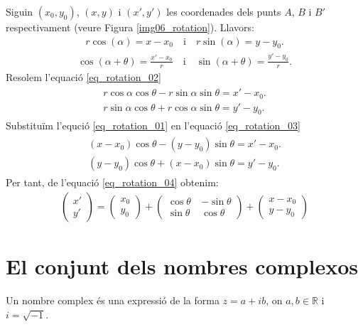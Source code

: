\documentclass[12pt,a4paper]{report}
\begin{document}
Siguin $(x_0,y_0)$, $(x,y)$ i $(x',y')$ les coordenades dels punts $A$, $B$ i $B'$ respectivament (veure Figura \ref{img06_rotation}). Llavors:
\begin{align}
r\cos(\alpha)=x-x_0 \quad\text{i}\quad r\sin(\alpha)=y-y_0.
\label{eq_rotation_01}
\end{align}
\begin{align}
\cos(\alpha+\theta)=\frac{x'-x_0}{r}\quad \text{i}\quad \sin(\alpha + \theta)=\frac{y'-y_0}{r}.
\label{eq_rotation_02}
\end{align}
Resolem l'equació \ref{eq_rotation_02}
\begin{align}
\begin{split}
r\cos\alpha\cos\theta-r\sin\alpha\sin\theta=x' - x_0.\\
r\sin\alpha\cos\theta+r\cos\alpha\sin\theta=y' - y_0.
\label{eq_rotation_03}
\end{split}
\end{align}
Substituïm l'equció \ref{eq_rotation_01} en l'equació \ref{eq_rotation_03}
\begin{align}
\begin{split}
(x-x_0)\cos\theta-(y-y_0)\sin\theta=x' - x_0.\\
(y-y_0)\cos\theta+(x-x_0)\sin\theta=y' - y_0.
\end{split}
\label{eq_rotation_04}
\end{align}
Per tant, de l'equació \ref{eq_rotation_04} obtenim:
\begin{align*}
\left(\begin{array}{l}
x'\\y'
\end{array}\right)=\left(\begin{array}{l}
x_0\\y_0
\end{array}\right) + \left(\begin{array}{lr}
\cos\theta\ & -\sin\theta\\
\sin\theta & \cos\theta
\end{array}\right) 
+ \left(\begin{array}{l}
x - x_0\\y - y_0
\end{array}\right)                       
\end{align*}
\section{El conjunt dels nombres complexos}

Un nombre complex és una expressió de la forma $z=a+ib$, on $a, b \in\mathbb{R}$ i $i=\sqrt{-1}$.
\end{document}
